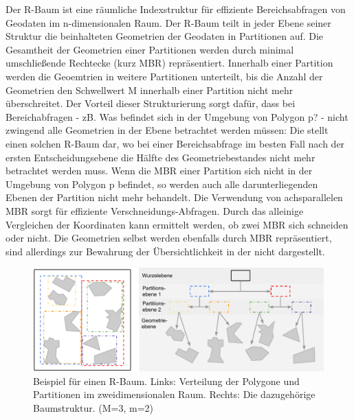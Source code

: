 \documentclass[runningheads,a4paper]{llncs}
\begin{document}
Der R-Baum ist eine räumliche Indexstruktur für effiziente Bereichsabfragen von Geodaten im n-dimensionalen Raum. Der R-Baum teilt in jeder Ebene seiner Struktur die beinhalteten Geometrien der Geodaten in Partitionen auf. Die Gesamtheit der Geometrien einer Partitionen werden durch minimal umschließende Rechtecke (kurz \acs{MBR}) repräsentiert. 
Innerhalb einer Partition werden die Geoemtrien in weitere Partitionen unterteilt, bis die Anzahl der Geometrien den Schwellwert \acs{M} innerhalb einer Partition nicht mehr überschreitet. Der Vorteil dieser Strukturierung sorgt dafür, dass bei Bereichabfragen - zB. Was befindet sich in der Umgebung von Polygon p? - nicht zwingend alle Geometrien in der Ebene betrachtet werden müssen: Die  stellt einen solchen R-Baum dar, wo bei einer Bereichsabfrage im besten Fall nach der ersten Entscheidungsebene die Hälfte des Geometriebestandes nicht mehr betrachtet werden muss. Wenn die \acs{MBR} einer Partition sich nicht in der Umgebung von Polygon p befindet, so werden auch alle darunterliegenden Ebenen der Partition nicht mehr behandelt. Die Verwendung von achsparallelen \acs{MBR} sorgt für effiziente Verschneidungs-Abfragen. Durch das alleinige Vergleichen der Koordinaten kann ermittelt werden, ob zwei \acs{MBR} sich schneiden oder nicht. Die Geometrien selbst werden ebenfalls durch \acs{MBR} repräsentiert, sind allerdings zur Bewahrung der Übersichtlichkeit in der  nicht dargestellt.
\begin{figure}[H]
		\begin{center}
		\includegraphics[width=1.0\textwidth ]{001_Beispiel_R-Tree.pdf}
		\caption{Beispiel für einen R-Baum. Links: Verteilung der Polygone und Partitionen im zweidimensionalen Raum. Rechts: Die dazugehörige Baumstruktur. (\acs{M}=3, \acs{m}=2)}
		\label{fig:beispiel-r-tree}
		\end{center}
	\end{figure}
\end{document}
